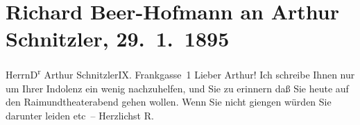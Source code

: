 

         
         \renewcommand{\erwaehntePersonen}{Personen: Richard Beer-Hofmann}
         \renewcommand{\erwaehnteOrte}{Orte: Frankgasse 1, I., Innere Stadt, IX., Alsergrund, Raimund-Theater, Wien}
         \renewcommand{\erwaehnteWerke}{}
               \section[Richard Beer-Hofmann an Arthur Schnitzler, 29. 1. 1895]{ Richard Beer-Hofmann an Arthur Schnitzler, 29. 1. 1895}\nopagebreak{}\rehead{ }\begin{ledgroupsized}[t]{13cm}\normalsize\beginnumbering \toendnotes[C]{\smallbreak\pagebreak[2]} 
\pstart{}{\pb}Herrn\pend{}\pstart{}D\textsuperscript{r} Arthur Schnitzler\pend{}\pstart{}IX. Frankgasse 1\pend{}{\bigskip}\pstart
           \noindent{}{\pb}Lieber Arthur! Ich schreibe Ihnen nur um Ihrer Indolenz ein wenig
               nachzuhelfen, und Sie zu erinnern daß Sie heute auf den Raimundtheaterabend gehen wollen. Wenn Sie nicht giengen würden Sie darunter
               leiden etc – Herzlichst \spacefill\mbox{R.}\pend
           
         
         \endnumbering{}\end{ledgroupsized}  \newcommand{\dateiname}{L00418}\newcommand{\titel}{Richard Beer-Hofmann an Arthur Schnitzler, 29. 1. 1895}\newcommand{\editorInnen}{Martin Anton Müller und Gerd-Hermann Susen}
      